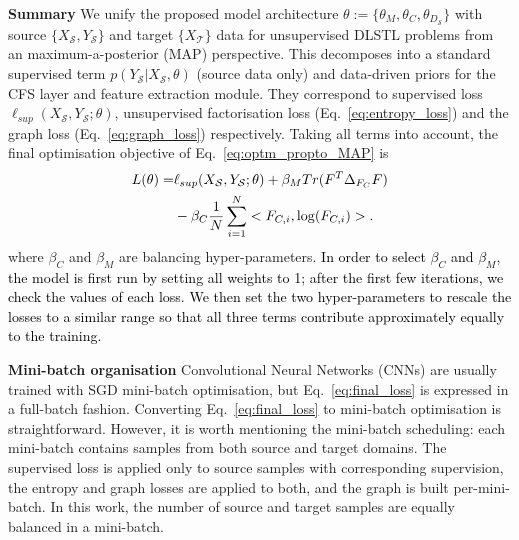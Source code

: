 \documentclass[letterpaper]{article} \usepackage{aaai19}  \usepackage{times}  \usepackage{helvet}  \usepackage{courier}  \usepackage{url}  \usepackage{graphicx}
\newcommand{\keypoint}[1]{\noindent\textbf{#1}\quad}
\begin{document}
\keypoint{Summary}
We unify the proposed model architecture $\theta := \{\theta_M, \theta_C, \theta_{D_\mathcal{S}}\}$ with source $\{X_\mathcal{S}, Y_\mathcal{S}\}$ and target  $\{X_\mathcal{T}\}$ data for unsupervised DLSTL problems from an maximum-a-posterior (MAP) perspective. This decomposes into a standard supervised term $p(Y_\mathcal{S}|X_\mathcal{S},\theta)$ (source data only) and data-driven priors for the CFS layer and feature extraction module. 
They correspond to supervised loss $\ell_{sup}(X_\mathcal{S},Y_\mathcal{S};\theta)$, unsupervised factorisation loss (Eq.~\ref{eq:entropy_loss}) and the graph loss (Eq.~\ref{eq:graph_loss}) respectively.
Taking all terms into account, the final optimisation objective of Eq.~\ref{eq:optm_propto_MAP} is 
\begin{equation}\label{eq:final_loss}
\begin{split}
	L(\theta) = &\textcolor{black}{\ell_{sup}(X_\mathcal{S},Y_\mathcal{S};\theta) + \beta_M Tr(F^{T} \Delta_{F_C} F)}\\
	& -\beta_C \frac{1}{N} \sum_{i=1}^{N} <F_{C,i}, \log(F_{C,i})>. \\
\end{split}
\end{equation}
where $\beta_C$ and $\beta_M$ are balancing hyper-parameters.
\textcolor{black}{In order to select $\beta_C$ and $\beta_M$, the model is first run by setting all weights to 1;  after the first few iterations, we check the values of each loss. We then set the two hyper-parameters to rescale the losses to a similar range so that all three terms contribute approximately equally to the training.}

\keypoint{Mini-batch organisation} Convolutional Neural Networks (CNNs) are usually trained with SGD mini-batch optimisation, but Eq.~\ref{eq:final_loss} is expressed in a full-batch fashion. Converting Eq.~\ref{eq:final_loss} to mini-batch optimisation is straightforward. 
However, it is worth mentioning the mini-batch scheduling: each mini-batch contains samples from both source and target domains. The supervised loss is applied only to source samples with corresponding supervision, the entropy and graph losses are applied to both, and the graph is built per-mini-batch. In this work, the number of source and target samples are equally balanced in a mini-batch.
 
\end{document}
